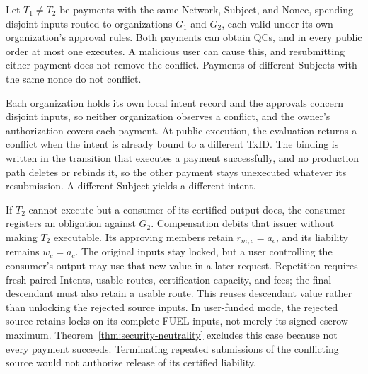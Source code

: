 \begin{lemma}
\label{lem:security-intent}
Let $T_1\ne T_2$ be payments with the same Network, Subject, and Nonce, spending disjoint inputs routed to organizations $G_1$ and $G_2$, each valid under its own organization's approval rules. Both payments can obtain QCs, and in every public order at most one executes. A malicious user can cause this, and resubmitting either payment does not remove the conflict. Payments of different Subjects with the same nonce do not conflict.
\end{lemma}
\begin{IEEEproof}
Each organization holds its own local intent record and the approvals concern disjoint inputs, so neither organization observes a conflict, and the owner's authorization covers each payment. At public execution, the evaluation returns a conflict when the intent is already bound to a different TxID. The binding is written in the transition that executes a payment successfully, and no production path deletes or rebinds it, so the other payment stays unexecuted whatever its resubmission. A different Subject yields a different intent.
\end{IEEEproof}

If $T_2$ cannot execute but a consumer of its certified output does,
the consumer registers an obligation against $G_2$. Compensation
debits that issuer without making $T_2$ executable. Its approving
members retain $r_{m,c}=a_c$, and its liability remains $w_c=a_c$.
The original inputs stay locked, but a user controlling the consumer's
output may use that new value in a later request. Repetition requires
fresh paired Intents, usable routes, certification capacity, and fees;
the final descendant must also retain a usable route. This reuses
descendant value rather than unlocking the rejected source inputs.
In user-funded mode, the rejected source retains locks on its complete
FUEL inputs, not merely its signed escrow maximum.
Theorem~\ref{thm:security-neutrality} excludes this case because not
every payment succeeds. Terminating repeated submissions of the
conflicting source would not authorize release of its certified
liability.

